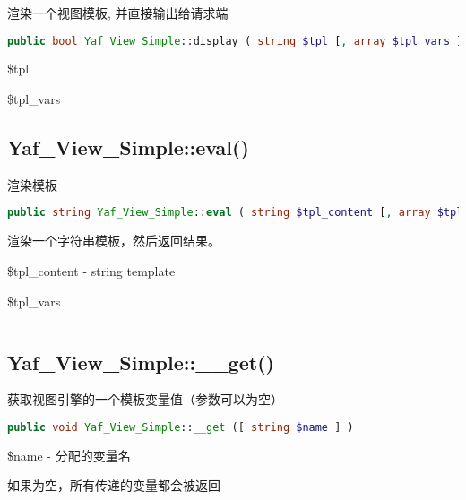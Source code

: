 渲染一个视图模板, 并直接输出给请求端

\begin{lstlisting}[language=PHP]
public bool Yaf_View_Simple::display ( string $tpl [, array $tpl_vars ] )
\end{lstlisting}

\begin{compactitem}
\item \$tpl
\item \$tpl\_vars
\end{compactitem}



\subsection{Yaf\_View\_Simple::eval()}

渲染模板

\begin{lstlisting}[language=PHP]
public string Yaf_View_Simple::eval ( string $tpl_content [, array $tpl_vars ] )
\end{lstlisting}

渲染一个字符串模板，然后返回结果。

\begin{compactitem}
\item \$tpl\_content - string template
\item \$tpl\_vars
\end{compactitem}



\begin{lstlisting}[language=PHP]

\end{lstlisting}

\subsection{Yaf\_View\_Simple::\_\_get()}

获取视图引擎的一个模板变量值（参数可以为空）

\begin{lstlisting}[language=PHP]
public void Yaf_View_Simple::__get ([ string $name ] )
\end{lstlisting}


\begin{compactitem}
\item \$name - 分配的变量名

如果为空，所有传递的变量都会被返回

\end{compactitem}



